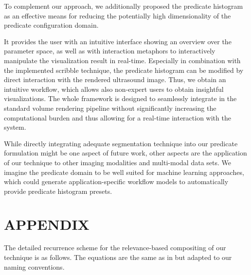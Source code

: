 To complement our approach, we additionally proposed the predicate histogram as an effective means for reducing the potentially high dimensionality of the predicate configuration domain. 

It provides the user with an intuitive interface showing an overview over the parameter space, as well as with interaction metaphors to interactively manipulate the visualization result in real-time. 
Especially in combination with the implemented scribble technique, the predicate histogram can be modified by direct interaction with the rendered ultrasound image. 
Thus, we obtain an intuitive workflow, which allows also non-expert users to obtain insightful visualizations. 
The whole framework is designed to seamlessly integrate in the standard volume rendering pipeline without significantly increasing the computational burden and thus allowing for a real-time interaction with the system. 


While directly integrating adequate segmentation technique into our predicate formulation might be one aspect of future work, other aspects are the application of our technique to other imaging modalities and multi-modal data sets.
We imagine the predicate domain to be well suited for machine learning approaches, which could generate application-specific workflow models to automatically provide predicate histogram presets. 


\section*{APPENDIX}
\label{sec:predicates:appendix}
\newcommand{\vis}{\text{vis}(\kappa(s), \kappa_i)}

The detailed recurrence scheme for the relevance-based compositing of our technique is as follows. The equations are the same as in \cite{Pinto10} but adapted to our naming conventions.

